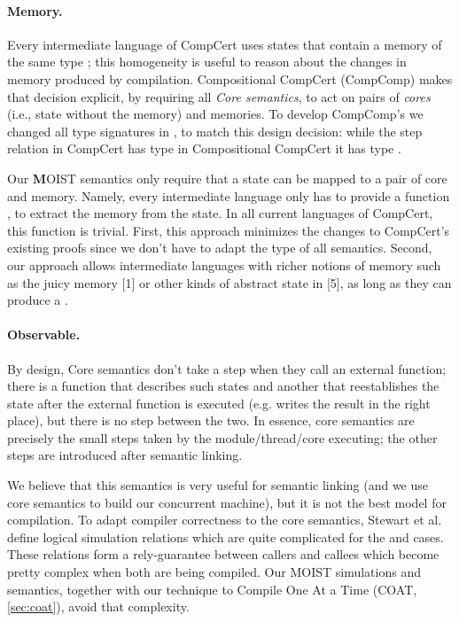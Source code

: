 \paragraph{Memory.} Every intermediate language of CompCert uses states that contain a memory of the same type ; this homogeneity is useful to reason about the changes in memory produced by compilation. Compositional CompCert (CompComp) makes that decision explicit, by requiring all  \emph{Core semantics}, to act on pairs of \emph{cores} (i.e., state without the memory) and memories. To develop CompComp's we changed all type signatures in \compcert , to match this design decision: while the step relation in CompCert has type  in Compositional CompCert it has type . 

Our \textbf{M}OIST semantics only require that a state can be mapped to a pair of core and memory. Namely, every intermediate language only has to provide a function , to extract the memory from the state. In all current languages of CompCert, this function is trivial. First, this approach minimizes the changes to CompCert's existing proofs since we don't have to adapt the type of all semantics. Second, our approach allows intermediate languages with richer notions of memory such as the juicy memory [1] or other kinds of abstract state in [5], as long as they can produce a  . 

\paragraph{Observable.} By design, Core semantics \cite{compcomp} don't take a step when they call an external function; there is a function   that describes such states and another  that reestablishes the state after the external function is executed (e.g. writes the result in the right place), but there is no step between the two. In essence, core semantics are precisely the small steps taken by the module/thread/core executing; the other steps are introduced after semantic linking. 

We believe that this semantics is very useful for semantic linking (and we use core semantics to build our concurrent machine), but it is not the best model for compilation. To adapt compiler correctness to the core semantics, Stewart et al. \cite{compcomp} define logical simulation relations which are quite complicated for the   and  cases. These relations form a rely-guarantee between callers and callees which become pretty complex when both are being compiled. Our MOIST simulations and semantics, together with our technique to Compile One At a Time (COAT, \autoref{sec:coat}), avoid that complexity.  

